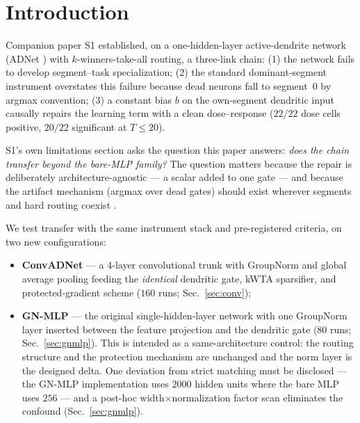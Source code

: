 \documentclass[review]{elsarticle}
\begin{document}
\section{Introduction}
\label{sec:intro}

Companion paper S1 \cite{zhou2026delpS1} established, on a
one-hidden-layer active-dendrite network (ADNet
\cite{iyer2022}) with $k$-winners-take-all routing, a three-link chain:
(1) the network fails to develop segment--task specialization;
(2) the standard dominant-segment instrument overstates this failure
because dead neurons fall to segment~0 by argmax convention;
(3) a constant bias $b$ on the own-segment dendritic input causally
repairs the learning term with a clean dose--response
($22/22$ dose cells positive, $20/22$ significant at $T \le 20$).

S1's own limitations section asks the question this paper answers:
\emph{does the chain transfer beyond the bare-MLP family?} The question
matters because the repair is deliberately architecture-agnostic ---
a scalar added to one gate --- and because the artifact mechanism
(argmax over dead gates) should exist wherever segments and hard
routing coexist \cite{boahen2022,poirazi2020}.

We test transfer with the same instrument stack and pre-registered
criteria, on two new configurations:

\begin{itemize}
\item \textbf{ConvADNet} --- a 4-layer convolutional trunk with
GroupNorm and global average pooling feeding the \emph{identical}
dendritic gate, kWTA sparsifier, and protected-gradient scheme
($160$ runs; Sec.~\ref{sec:conv});
\item \textbf{GN-MLP} --- the original single-hidden-layer network
with one GroupNorm layer inserted between the feature projection and
the dendritic gate ($80$ runs; Sec.~\ref{sec:gnmlp}). This is intended
as a same-architecture control: the routing structure and the
protection mechanism are unchanged and the norm layer is the designed
delta. One deviation from strict matching must be disclosed --- the
GN-MLP implementation uses $2000$ hidden units where the bare MLP uses
$256$ --- and a post-hoc width$\times$normalization factor scan
eliminates the confound (Sec.~\ref{sec:gnmlp}).
\end{itemize}
\end{document}
